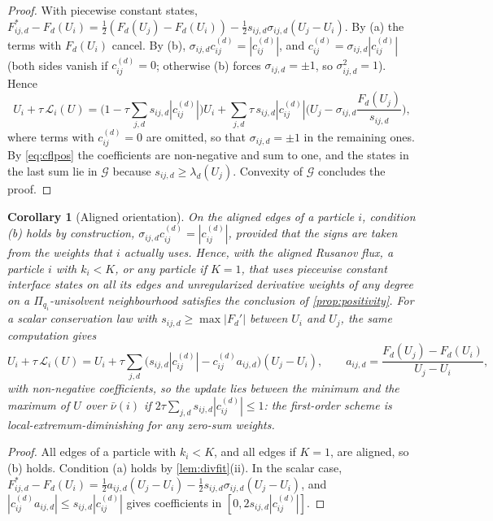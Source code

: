\documentclass[11pt,a4paper]{article}
\theoremstyle{plain}
\newtheorem{corollary}[theorem]{Corollary}
\theoremstyle{definition}
\theoremstyle{remark}
\numberwithin{equation}{section}
\newcommand{\cnb}{\bar\nu}
\newcommand{\Ad}{\mathcal{G}}
\newcommand{\Lop}{\mathcal{L}}
\newcommand{\Fs}{F^{*}}
\begin{document}
\begin{proof}
With piecewise constant states, $\Fs_{ij,d}-F_d(U_i)=\tfrac12(F_d(U_j)-F_d(U_i))-\tfrac12s_{ij,d}\sigma_{ij,d}(U_j-U_i)$. By (a) the terms with $F_d(U_i)$ cancel. By (b), $\sigma_{ij,d}c^{(d)}_{ij}=|c^{(d)}_{ij}|$, and $c^{(d)}_{ij}=\sigma_{ij,d}|c^{(d)}_{ij}|$ (both sides vanish if $c^{(d)}_{ij}=0$; otherwise (b) forces $\sigma_{ij,d}=\pm1$, so $\sigma_{ij,d}^2=1$). Hence
\begin{equation*}
U_i+\tau\,\Lop_i(U)=\Big(1-\tau\sum_{j,d}s_{ij,d}|c^{(d)}_{ij}|\Big)U_i+\sum_{j,d}\tau\,s_{ij,d}|c^{(d)}_{ij}|\Big(U_j-\sigma_{ij,d}\frac{F_d(U_j)}{s_{ij,d}}\Big),
\end{equation*}
where terms with $c^{(d)}_{ij}=0$ are omitted, so that $\sigma_{ij,d}=\pm1$ in the remaining ones. By \eqref{eq:cflpos} the coefficients are non-negative and sum to one, and the states in the last sum lie in $\Ad$ because $s_{ij,d}\ge\lambda_d(U_j)$. Convexity of $\Ad$ concludes the proof.
\end{proof}

\begin{corollary}[Aligned orientation]\label{cor:aligned}
On the aligned edges of a particle $i$, condition (b) holds by construction, $\sigma_{ij,d}c^{(d)}_{ij}=|c^{(d)}_{ij}|$, provided that the signs are taken from the weights that $i$ actually uses. Hence, with the aligned Rusanov flux, a particle $i$ with $k_i<K$, or any particle if $K=1$, that uses piecewise constant interface states on all its edges and unregularized derivative weights of any degree on a $\Pi_{q_i}$-unisolvent neighbourhood satisfies the conclusion of \cref{prop:positivity}. For a scalar conservation law with $s_{ij,d}\ge\max|F_d'|$ between $U_i$ and $U_j$, the same computation gives
\[
U_i+\tau\,\Lop_i(U)=U_i+\tau\sum_{j,d}\big(s_{ij,d}|c^{(d)}_{ij}|-c^{(d)}_{ij}a_{ij,d}\big)(U_j-U_i),\qquad a_{ij,d}=\frac{F_d(U_j)-F_d(U_i)}{U_j-U_i},
\]
with non-negative coefficients, so the update lies between the minimum and the maximum of $U$ over $\cnb(i)$ if $2\tau\sum_{j,d}s_{ij,d}|c^{(d)}_{ij}|\le1$: the first-order scheme is local-extremum-diminishing for any zero-sum weights.
\end{corollary}

\begin{proof}
All edges of a particle with $k_i<K$, and all edges if $K=1$, are aligned, so (b) holds. Condition (a) holds by \cref{lem:divfit}(ii). In the scalar case, $\Fs_{ij,d}-F_d(U_i)=\tfrac12a_{ij,d}(U_j-U_i)-\tfrac12s_{ij,d}\sigma_{ij,d}(U_j-U_i)$, and $|c^{(d)}_{ij}a_{ij,d}|\le s_{ij,d}|c^{(d)}_{ij}|$ gives coefficients in $[0,2s_{ij,d}|c^{(d)}_{ij}|]$.
\end{proof}
\end{document}
